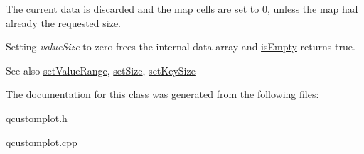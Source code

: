 The current data is discarded and the map cells are set to 0, unless the map had already the requested size.

Setting {\itshape value\+Size} to zero frees the internal data array and \hyperlink{class_q_c_p_color_map_data_aea88cc75a76ca571acf29b2ba8ac970d}{is\+Empty} returns true.

\begin{DoxySeeAlso}{See also}
\hyperlink{class_q_c_p_color_map_data_ada1b2680ba96a5f4175b6d341cf75d23}{set\+Value\+Range}, \hyperlink{class_q_c_p_color_map_data_a0d9ff35c299d0478b682bfbcdd9c097e}{set\+Size}, \hyperlink{class_q_c_p_color_map_data_ac7ef70e383aface34b44dbde49234b6b}{set\+Key\+Size} 
\end{DoxySeeAlso}


The documentation for this class was generated from the following files\+:\begin{DoxyCompactItemize}
\item 
qcustomplot.\+h\item 
qcustomplot.\+cpp\end{DoxyCompactItemize}
